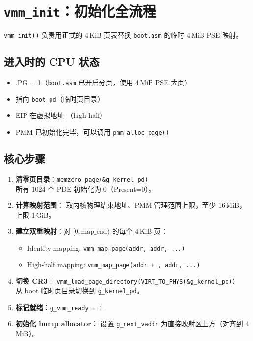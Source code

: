 \section{\texttt{vmm\_init}：初始化全流程}

\texttt{vmm\_init()} 负责用正式的 4\,KiB 页表替换 \texttt{boot.asm} 的临时 4\,MiB PSE 映射。

\subsection{进入时的 CPU 状态}

\begin{cpustate}
\begin{itemize}
  \item {}.PG = 1（\texttt{boot.asm} 已开启分页，使用 4\,MiB PSE 大页）
  \item {} 指向 \texttt{boot\_pd}（临时页目录）
  \item EIP 在虚拟地址 （high-half）
  \item PMM 已初始化完毕，可以调用 \texttt{pmm\_alloc\_page()}
\end{itemize}
\end{cpustate}

\subsection{核心步骤}

\begin{enumerate}
  \item \textbf{清零页目录}：\texttt{memzero\_page(\&g\_kernel\_pd)} \\
        所有 1024 个 PDE 初始化为 0（Present=0）。

  \item \textbf{计算映射范围}：
        取内核物理结束地址、PMM 管理范围上限，至少 16\,MiB，上限 1\,GiB。

  \item \textbf{建立双重映射}：对 $[0, \text{map\_end})$ 的每个 4\,KiB 页：
    \begin{itemize}
      \item Identity mapping: \texttt{vmm\_map\_page(addr, addr, ...)}
      \item High-half mapping: \texttt{vmm\_map\_page(addr + , addr, ...)}
    \end{itemize}

  \item \textbf{切换 CR3}：
        \texttt{vmm\_load\_page\_directory(VIRT\_TO\_PHYS(\&g\_kernel\_pd))} \\
        从 boot 临时页目录切换到 \texttt{g\_kernel\_pd}。

  \item \textbf{标记就绪}：\texttt{g\_vmm\_ready = 1}

  \item \textbf{初始化 bump allocator}：
        设置 \texttt{g\_next\_vaddr} 为直接映射区上方（对齐到 4\,MiB）。
\end{enumerate}

